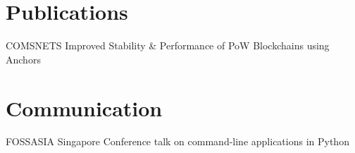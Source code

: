 \section{Publications}
    {COMSNETS}
    {}
    {}
    {
        Improved Stability \& Performance of PoW Blockchains using Anchors
    }
    {
    }
    \vspace*{-0.5cm}
    
\section{Communication}
    {FOSSASIA}
    {}
    {Singapore}
    {
        Conference talk on command-line applications in Python
    }
    {
    }
    \vspace*{0.2\baselineskip}

